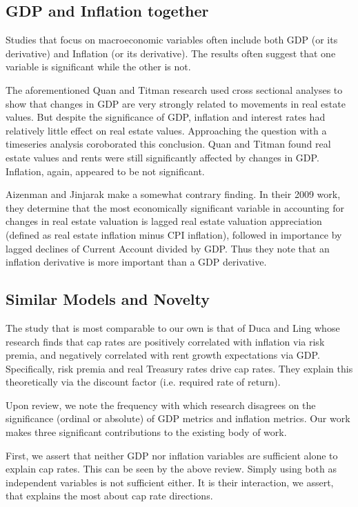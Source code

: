 \subsection{GDP and Inflation together}

Studies that focus on macroeconomic variables often include both GDP (or its derivative) and Inflation (or its derivative). The results often suggest that one variable is significant while the other is not. 

The aforementioned Quan and Titman research used cross sectional analyses to show that changes in GDP are very strongly related to movements in real estate values. But despite the significance of GDP, inflation and interest rates had relatively little effect on real estate values. Approaching the question with a timeseries analysis coroborated this conclusion. Quan and Titman found real estate values and rents were still significantly affected by changes in GDP. Inflation, again, appeared to be not significant. 

Aizenman and Jinjarak make a somewhat contrary finding. In their 2009 work, \citep*{aizenman2009current} they determine that the most economically significant variable in accounting for changes in real estate valuation is lagged real estate valuation appreciation (defined as real estate inflation minus CPI inflation), followed in importance by lagged declines of Current Account divided by GDP. Thus they note that an inflation derivative is more important than a GDP derivative. 

\subsection{Similar Models and Novelty}

The study that is most comparable to our own is that of Duca and Ling \citep*{duca2017taxes} whose research finds that cap rates are positively correlated with inflation via risk premia, and negatively correlated with rent growth expectations via GDP. Specifically, risk premia and real Treasury rates drive cap rates. They explain this theoretically via the discount factor (i.e. required rate of return).

Upon review, we note the frequency with which research disagrees on the significance (ordinal or absolute) of GDP metrics and inflation metrics. Our work makes three significant contributions to the existing body of work. 

First, we assert that neither GDP nor inflation variables are sufficient alone to explain cap rates. This can be seen by the above review. Simply using both as independent variables is not sufficient either. It is their interaction, we assert, that explains the most about cap rate directions. 


